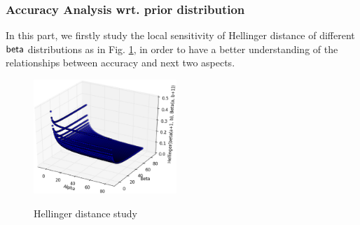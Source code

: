 \documentclass[sigconf, anonymous]{acmart}
\begin{document}
\begin{itemize}
\begin{itemize}


	\end{itemize}  

\end{itemize}

\subsubsection{Accuracy Analysis wrt. prior distribution}
In this part, we firstly study the local sensitivity of Hellinger distance of different $\mathsf{beta}$ distributions as in Fig. \ref{fig_sensitivity}, in order to have a better understanding of the relationships between accuracy and next two aspects.

\begin{figure}[ht]
\centering
\includegraphics[width=0.48\textwidth]{sensitivity}
\label{fig_sensitivity}
\caption{Hellinger distance study}
\end{figure}
\end{document}
